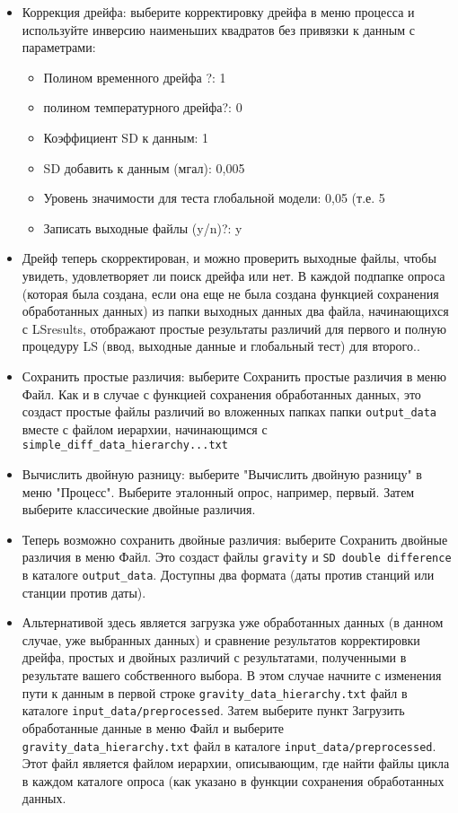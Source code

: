 \begin{itemize}
    \item Коррекция дрейфа: выберите корректировку дрейфа в меню процесса и
    используйте инверсию наименьших квадратов без привязки к данным с
    параметрами:
    \begin{itemize}
        \item Полином временного дрейфа ?: 1
        \item полином температурного дрейфа?: 0
        \item Коэффициент SD к данным: 1
        \item SD добавить к данным (мгал): 0,005
        \item Уровень значимости для теста глобальной модели: 0,05 (т.е. 5%
        \item Записать выходные файлы (y/n)?: y
    \end{itemize}

    \item Дрейф теперь скорректирован, и можно проверить выходные файлы, чтобы
    увидеть, удовлетворяет ли поиск дрейфа или нет. В каждой подпапке опроса
    (которая была создана, если она еще не была создана функцией сохранения
    обработанных данных) из папки выходных данных два файла, начинающихся с
    LSresults, отображают простые результаты различий для первого и полную
    процедуру LS (ввод, выходные данные и глобальный тест) для второго..

    \item Сохранить простые различия: выберите Сохранить простые различия в меню
    Файл. Как и в случае с функцией сохранения обработанных данных, это создаст
    простые файлы различий во вложенных папках папки \verb|output_data| вместе с файлом
    иерархии, начинающимся с \verb|simple_diff_data_hierarchy...txt|

    \item Вычислить двойную разницу: выберите "Вычислить двойную разницу" в меню
    "Процесс". Выберите эталонный опрос, например, первый. Затем выберите
    классические двойные различия.

    \item Теперь возможно сохранить двойные различия: выберите Сохранить двойные
    различия в меню Файл. Это создаст файлы \verb|gravity| и \verb|SD double difference| в
    каталоге \verb|output_data|. Доступны два формата (даты против станций или станции
    против даты).

    \item Альтернативой здесь является загрузка уже обработанных данных (в
    данном случае, уже выбранных данных) и сравнение результатов корректировки
    дрейфа, простых и двойных различий с результатами, полученными в результате
    вашего собственного выбора. В этом случае начните с изменения пути к данным
    в первой строке \verb|gravity_data_hierarchy.txt| файл в каталоге
    \verb|input_data/preprocessed|. Затем выберите пункт Загрузить обработанные данные
    в меню Файл и выберите \verb|gravity_data_hierarchy.txt| файл в каталоге
    \verb|input_data/preprocessed|. Этот файл является файлом иерархии, описывающим,
    где найти файлы цикла в каждом каталоге опроса (как указано в функции
    сохранения обработанных данных.
    

\end{itemize}
